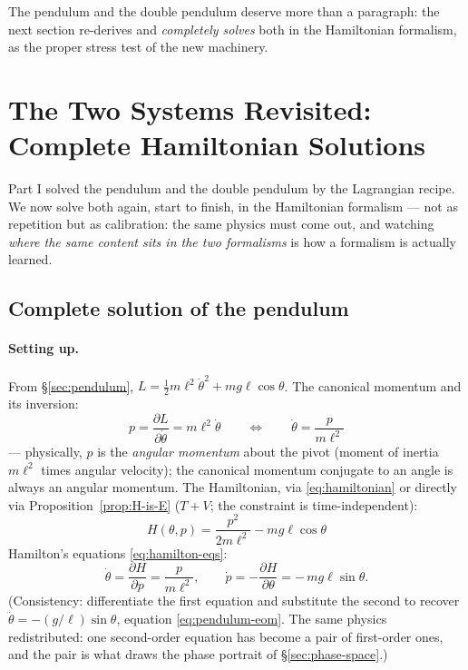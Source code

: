 \documentclass[11pt]{article}
\theoremstyle{plain}
\theoremstyle{definition}
\theoremstyle{remark}
\newcommand{\pd}[2]{\frac{\partial #1}{\partial #2}}
\begin{document}
The pendulum and the double pendulum deserve more than a paragraph: the
next section re-derives and \emph{completely solves} both in the
Hamiltonian formalism, as the proper stress test of the new machinery.

\section{The Two Systems Revisited: Complete Hamiltonian Solutions}
\label{sec:revisit}

Part I solved the pendulum and the double pendulum by the Lagrangian
recipe. We now solve both again, start to finish, in the Hamiltonian
formalism --- not as repetition but as calibration: the same physics must
come out, and watching \emph{where the same content sits in the two
formalisms} is how a formalism is actually learned.

\subsection{Complete solution of the pendulum}
\label{sec:pendulum-H}

\paragraph{Setting up.}
From \S\ref{sec:pendulum}, $L = \tfrac12 m\ell^2\dot\theta^2 +
mg\ell\cos\theta$. The canonical momentum and its inversion:
\begin{equation}
  p = \pd{L}{\dot\theta} = m\ell^2\dot\theta
  \qquad\Longleftrightarrow\qquad
  \dot\theta = \frac{p}{m\ell^2}
\end{equation}
--- physically, $p$ is the \emph{angular momentum} about the pivot
(moment of inertia $m\ell^2$ times angular velocity); the canonical
momentum conjugate to an angle is always an angular momentum. The
Hamiltonian, via \eqref{eq:hamiltonian} or directly via
Proposition~\ref{prop:H-is-E} ($T + V$; the constraint is
time-independent):
\begin{equation}
  \boxed{\;
  H(\theta, p) = \frac{p^2}{2m\ell^2} - mg\ell\cos\theta
  \;}
  \label{eq:pendulum-H}
\end{equation}
Hamilton's equations \eqref{eq:hamilton-eqs}:
\begin{equation}
  \dot\theta = \pd{H}{p} = \frac{p}{m\ell^2},
  \qquad
  \dot p = -\pd{H}{\theta} = -\,mg\ell\sin\theta .
  \label{eq:pendulum-hamilton}
\end{equation}
(Consistency: differentiate the first equation and substitute the second
to recover $\ddot\theta = -(g/\ell)\sin\theta$, equation
\eqref{eq:pendulum-eom}. The same physics redistributed: one
second-order
equation has become a pair of first-order ones, and the pair is what
draws the phase portrait of \S\ref{sec:phase-space}.)
\end{document}
